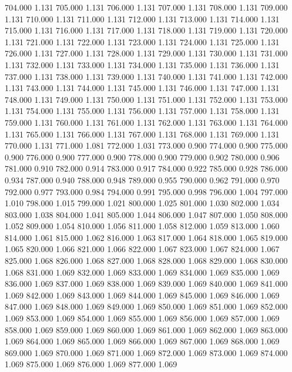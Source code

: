 704.000 1.131 
705.000 1.131 
706.000 1.131 
707.000 1.131 
708.000 1.131 
709.000 1.131 
710.000 1.131 
711.000 1.131 
712.000 1.131 
713.000 1.131 
714.000 1.131 
715.000 1.131 
716.000 1.131 
717.000 1.131 
718.000 1.131 
719.000 1.131 
720.000 1.131 
721.000 1.131 
722.000 1.131 
723.000 1.131 
724.000 1.131 
725.000 1.131 
726.000 1.131 
727.000 1.131 
728.000 1.131 
729.000 1.131 
730.000 1.131 
731.000 1.131 
732.000 1.131 
733.000 1.131 
734.000 1.131 
735.000 1.131 
736.000 1.131 
737.000 1.131 
738.000 1.131 
739.000 1.131 
740.000 1.131 
741.000 1.131 
742.000 1.131 
743.000 1.131 
744.000 1.131 
745.000 1.131 
746.000 1.131 
747.000 1.131 
748.000 1.131 
749.000 1.131 
750.000 1.131 
751.000 1.131 
752.000 1.131 
753.000 1.131 
754.000 1.131 
755.000 1.131 
756.000 1.131 
757.000 1.131 
758.000 1.131 
759.000 1.131 
760.000 1.131 
761.000 1.131 
762.000 1.131 
763.000 1.131 
764.000 1.131 
765.000 1.131 
766.000 1.131 
767.000 1.131 
768.000 1.131 
769.000 1.131 
770.000 1.131 
771.000 1.081 
772.000 1.031 
773.000 0.900 
774.000 0.900 
775.000 0.900 
776.000 0.900 
777.000 0.900 
778.000 0.900 
779.000 0.902 
780.000 0.906 
781.000 0.910 
782.000 0.914 
783.000 0.917 
784.000 0.922 
785.000 0.928 
786.000 0.934 
787.000 0.940 
788.000 0.948 
789.000 0.955 
790.000 0.962 
791.000 0.970 
792.000 0.977 
793.000 0.984 
794.000 0.991 
795.000 0.998 
796.000 1.004 
797.000 1.010 
798.000 1.015 
799.000 1.021 
800.000 1.025 
801.000 1.030 
802.000 1.034 
803.000 1.038 
804.000 1.041 
805.000 1.044 
806.000 1.047 
807.000 1.050 
808.000 1.052 
809.000 1.054 
810.000 1.056 
811.000 1.058 
812.000 1.059 
813.000 1.060 
814.000 1.061 
815.000 1.062 
816.000 1.063 
817.000 1.064 
818.000 1.065 
819.000 1.065 
820.000 1.066 
821.000 1.066 
822.000 1.067 
823.000 1.067 
824.000 1.067 
825.000 1.068 
826.000 1.068 
827.000 1.068 
828.000 1.068 
829.000 1.068 
830.000 1.068 
831.000 1.069 
832.000 1.069 
833.000 1.069 
834.000 1.069 
835.000 1.069 
836.000 1.069 
837.000 1.069 
838.000 1.069 
839.000 1.069 
840.000 1.069 
841.000 1.069 
842.000 1.069 
843.000 1.069 
844.000 1.069 
845.000 1.069 
846.000 1.069 
847.000 1.069 
848.000 1.069 
849.000 1.069 
850.000 1.069 
851.000 1.069 
852.000 1.069 
853.000 1.069 
854.000 1.069 
855.000 1.069 
856.000 1.069 
857.000 1.069 
858.000 1.069 
859.000 1.069 
860.000 1.069 
861.000 1.069 
862.000 1.069 
863.000 1.069 
864.000 1.069 
865.000 1.069 
866.000 1.069 
867.000 1.069 
868.000 1.069 
869.000 1.069 
870.000 1.069 
871.000 1.069 
872.000 1.069 
873.000 1.069 
874.000 1.069 
875.000 1.069 
876.000 1.069 
877.000 1.069 
